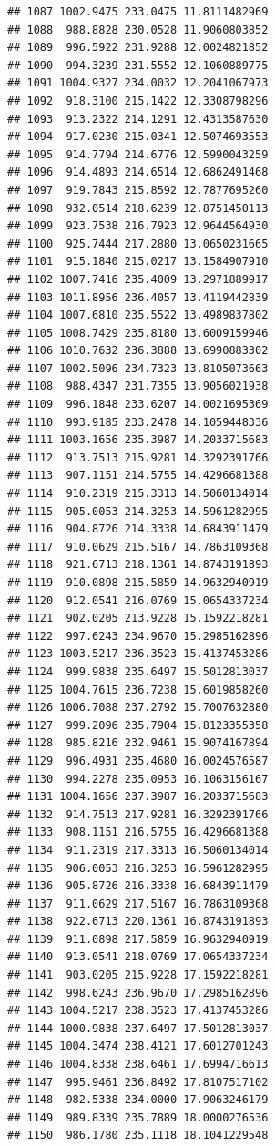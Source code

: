 \documentclass[
]{article}
\begin{document}
\begin{verbatim}
## 1087 1002.9475 233.0475 11.8111482969
## 1088  988.8828 230.0528 11.9060803852
## 1089  996.5922 231.9288 12.0024821852
## 1090  994.3239 231.5552 12.1060889775
## 1091 1004.9327 234.0032 12.2041067973
## 1092  918.3100 215.1422 12.3308798296
## 1093  913.2322 214.1291 12.4313587630
## 1094  917.0230 215.0341 12.5074693553
## 1095  914.7794 214.6776 12.5990043259
## 1096  914.4893 214.6514 12.6862491468
## 1097  919.7843 215.8592 12.7877695260
## 1098  932.0514 218.6239 12.8751450113
## 1099  923.7538 216.7923 12.9644564930
## 1100  925.7444 217.2880 13.0650231665
## 1101  915.1840 215.0217 13.1584907910
## 1102 1007.7416 235.4009 13.2971889917
## 1103 1011.8956 236.4057 13.4119442839
## 1104 1007.6810 235.5522 13.4989837802
## 1105 1008.7429 235.8180 13.6009159946
## 1106 1010.7632 236.3888 13.6990883302
## 1107 1002.5096 234.7323 13.8105073663
## 1108  988.4347 231.7355 13.9056021938
## 1109  996.1848 233.6207 14.0021695369
## 1110  993.9185 233.2478 14.1059448336
## 1111 1003.1656 235.3987 14.2033715683
## 1112  913.7513 215.9281 14.3292391766
## 1113  907.1151 214.5755 14.4296681388
## 1114  910.2319 215.3313 14.5060134014
## 1115  905.0053 214.3253 14.5961282995
## 1116  904.8726 214.3338 14.6843911479
## 1117  910.0629 215.5167 14.7863109368
## 1118  921.6713 218.1361 14.8743191893
## 1119  910.0898 215.5859 14.9632940919
## 1120  912.0541 216.0769 15.0654337234
## 1121  902.0205 213.9228 15.1592218281
## 1122  997.6243 234.9670 15.2985162896
## 1123 1003.5217 236.3523 15.4137453286
## 1124  999.9838 235.6497 15.5012813037
## 1125 1004.7615 236.7238 15.6019858260
## 1126 1006.7088 237.2792 15.7007632880
## 1127  999.2096 235.7904 15.8123355358
## 1128  985.8216 232.9461 15.9074167894
## 1129  996.4931 235.4680 16.0024576587
## 1130  994.2278 235.0953 16.1063156167
## 1131 1004.1656 237.3987 16.2033715683
## 1132  914.7513 217.9281 16.3292391766
## 1133  908.1151 216.5755 16.4296681388
## 1134  911.2319 217.3313 16.5060134014
## 1135  906.0053 216.3253 16.5961282995
## 1136  905.8726 216.3338 16.6843911479
## 1137  911.0629 217.5167 16.7863109368
## 1138  922.6713 220.1361 16.8743191893
## 1139  911.0898 217.5859 16.9632940919
## 1140  913.0541 218.0769 17.0654337234
## 1141  903.0205 215.9228 17.1592218281
## 1142  998.6243 236.9670 17.2985162896
## 1143 1004.5217 238.3523 17.4137453286
## 1144 1000.9838 237.6497 17.5012813037
## 1145 1004.3474 238.4121 17.6012701243
## 1146 1004.8338 238.6461 17.6994716613
## 1147  995.9461 236.8492 17.8107517102
## 1148  982.5338 234.0000 17.9063246179
## 1149  989.8339 235.7889 18.0000276536
## 1150  986.1780 235.1118 18.1041229548

\end{verbatim}
\end{document}
